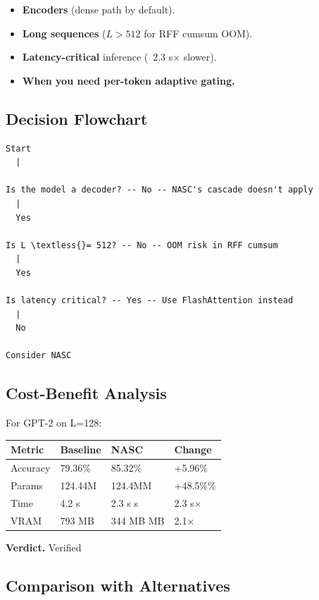 \begin{itemize}
\item \textbf{Encoders} (dense path by default).
\item \textbf{Long sequences} ($L > 512$ for RFF cumsum OOM).
\item \textbf{Latency-critical} inference (~2.3 s$\times$ slower).
\item \textbf{When you need per-token adaptive gating.}

\end{itemize}
\subsection{Decision Flowchart}

\begin{lstlisting}
Start
  |
   
Is the model a decoder? -- No -- NASC's cascade doesn't apply
  |
  Yes
   
Is L \textless{}= 512? -- No -- OOM risk in RFF cumsum
  |
  Yes
   
Is latency critical? -- Yes -- Use FlashAttention instead
  |
  No
   
Consider NASC
\end{lstlisting}

\subsection{Cost-Benefit Analysis}

For GPT-2 on L=128:

\begin{table}[H]
\centering
\small
\begin{tabular}{llll}
\toprule
\textbf{Metric} & \textbf{Baseline} & \textbf{NASC} & \textbf{Change} \\
\midrule
Accuracy & 79.36\% & 85.32\% & +5.96\% \\
Params & 124.44M & 124.4MM & +48.5\%\% \\
Time & 4.2 s & 2.3 s s & 2.3 s$\times$ \\
VRAM & 793 MB & 344 MB MB & 2.1$\times$ \\
\bottomrule
\end{tabular}
\end{table}

\textbf{Verdict.} Verified

\subsection{Comparison with Alternatives}

